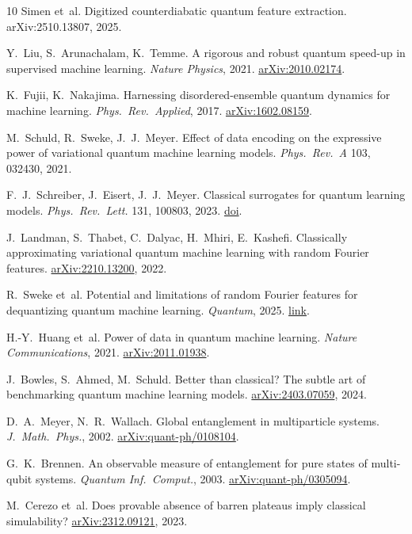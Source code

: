 \documentclass[11pt]{article}
\begin{document}

\begin{thebibliography}{10}\small
Simen et~al. Digitized counterdiabatic quantum feature extraction. arXiv:2510.13807, 2025.

Y.~Liu, S.~Arunachalam, K.~Temme. A rigorous and robust quantum speed-up in supervised machine learning.
\emph{Nature Physics}, 2021. \href{https://arxiv.org/abs/2010.02174}{arXiv:2010.02174}.

K.~Fujii, K.~Nakajima. Harnessing disordered-ensemble quantum dynamics for machine learning.
\emph{Phys.\ Rev.\ Applied}, 2017. \href{https://arxiv.org/abs/1602.08159}{arXiv:1602.08159}.

M.~Schuld, R.~Sweke, J.~J.~Meyer. Effect of data encoding on the expressive power of variational quantum
machine learning models. \emph{Phys.\ Rev.\ A} 103, 032430, 2021.

F.~J.~Schreiber, J.~Eisert, J.~J.~Meyer. Classical surrogates for quantum learning models.
\emph{Phys.\ Rev.\ Lett.} 131, 100803, 2023. \href{https://link.aps.org/doi/10.1103/PhysRevLett.131.100803}{doi}.

J.~Landman, S.~Thabet, C.~Dalyac, H.~Mhiri, E.~Kashefi. Classically approximating variational quantum machine
learning with random Fourier features. \href{https://arxiv.org/abs/2210.13200}{arXiv:2210.13200}, 2022.

R.~Sweke et~al. Potential and limitations of random Fourier features for dequantizing quantum machine
learning. \emph{Quantum}, 2025. \href{https://quantum-journal.org/papers/q-2025-02-20-1640/}{link}.

H.-Y.~Huang et~al. Power of data in quantum machine learning. \emph{Nature Communications}, 2021.
\href{https://arxiv.org/abs/2011.01938}{arXiv:2011.01938}.

J.~Bowles, S.~Ahmed, M.~Schuld. Better than classical? The subtle art of benchmarking quantum machine learning
models. \href{https://arxiv.org/abs/2403.07059}{arXiv:2403.07059}, 2024.

D.~A.~Meyer, N.~R.~Wallach. Global entanglement in multiparticle systems. \emph{J.\ Math.\ Phys.}, 2002.
\href{https://arxiv.org/abs/quant-ph/0108104}{arXiv:quant-ph/0108104}.

G.~K.~Brennen. An observable measure of entanglement for pure states of multi-qubit systems.
\emph{Quantum Inf.\ Comput.}, 2003. \href{https://arxiv.org/abs/quant-ph/0305094}{arXiv:quant-ph/0305094}.

M.~Cerezo et~al. Does provable absence of barren plateaus imply classical simulability?
\href{https://arxiv.org/abs/2312.09121}{arXiv:2312.09121}, 2023.
\end{thebibliography}
\end{document}
